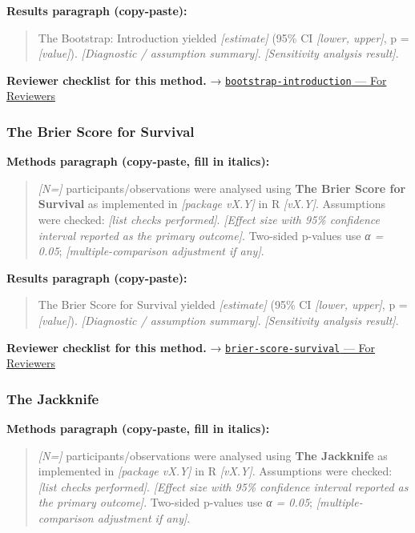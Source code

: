 \documentclass[
]{article}
\begin{document}
\textbf{Results paragraph (copy-paste):}

\begin{quote}
The Bootstrap: Introduction yielded \emph{{[}estimate{]}} (95\% CI
\emph{{[}lower, upper{]}}, p = \emph{{[}value{]}}). \emph{{[}Diagnostic
/ assumption summary{]}}. \emph{{[}Sensitivity analysis result{]}}.
\end{quote}

\textbf{Reviewer checklist for this method.} →
\href{../chapters/04-inferential/bootstrap-introduction.Rmd\#for-reviewers}{\texttt{bootstrap-introduction}
--- For Reviewers}

\subsubsection{The Brier Score for
Survival}\label{the-brier-score-for-survival}

\textbf{Methods paragraph (copy-paste, fill in italics):}

\begin{quote}
\emph{{[}N={]}} participants/observations were analysed using
\textbf{The Brier Score for Survival} as implemented in \emph{{[}package
vX.Y{]}} in R \emph{{[}vX.Y{]}}. Assumptions were checked: \emph{{[}list
checks performed{]}}. \emph{{[}Effect size with 95\% confidence interval
reported as the primary outcome{]}}. Two-sided p-values use \emph{α =
0.05}; \emph{{[}multiple-comparison adjustment if any{]}}.
\end{quote}

\textbf{Results paragraph (copy-paste):}

\begin{quote}
The Brier Score for Survival yielded \emph{{[}estimate{]}} (95\% CI
\emph{{[}lower, upper{]}}, p = \emph{{[}value{]}}). \emph{{[}Diagnostic
/ assumption summary{]}}. \emph{{[}Sensitivity analysis result{]}}.
\end{quote}

\textbf{Reviewer checklist for this method.} →
\href{../chapters/11-survival/brier-score-survival.Rmd\#for-reviewers}{\texttt{brier-score-survival}
--- For Reviewers}

\subsubsection{The Jackknife}\label{the-jackknife}

\textbf{Methods paragraph (copy-paste, fill in italics):}

\begin{quote}
\emph{{[}N={]}} participants/observations were analysed using
\textbf{The Jackknife} as implemented in \emph{{[}package vX.Y{]}} in R
\emph{{[}vX.Y{]}}. Assumptions were checked: \emph{{[}list checks
performed{]}}. \emph{{[}Effect size with 95\% confidence interval
reported as the primary outcome{]}}. Two-sided p-values use \emph{α =
0.05}; \emph{{[}multiple-comparison adjustment if any{]}}.
\end{quote}
\end{document}
